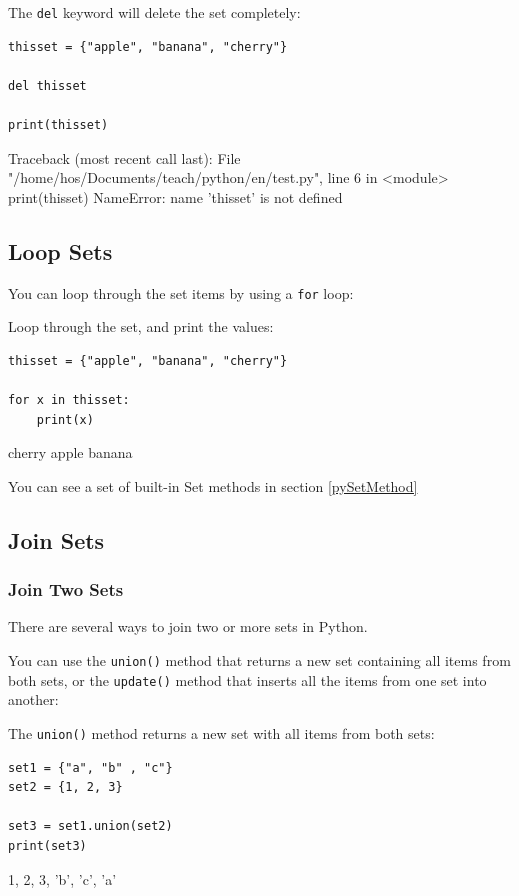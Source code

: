 \documentclass[12pt,a4paper]{article}
\newcommand{\code}[1]{%
	\colorbox{backcolour}{\lstinline{#1}}%
}
\newcommand{\lcode}[1]{%
	\lstinline{#1}%
}
\begin{document}
\begin{abox}
The \lcode{del} keyword will delete the set completely:
	\begin{lstlisting}
thisset = {"apple", "banana", "cherry"}

del thisset

print(thisset)
	\end{lstlisting}
\tcblower
	\begin{vercode}
Traceback (most recent call last):
  File "/home/hos/Documents/teach/python/en/test.py", line 6
  in <module>
    print(thisset)
NameError: name 'thisset' is not defined
	\end{vercode}
\end{abox}
% 
\subsection{Loop Sets}

You can loop through the set items by using a \code{for} loop:

\begin{ebox}
Loop through the set, and print the values:
	\begin{lstlisting}
thisset = {"apple", "banana", "cherry"}

for x in thisset:
    print(x)
	\end{lstlisting}
\tcblower
	\begin{vercode}
cherry
apple
banana
	\end{vercode}
\end{ebox}
You can see a set of built-in Set methods in section \ref{pySetMethod}
\subsection{Join Sets}

\subsubsection{Join Two Sets}

There are several ways to join two or more sets in Python.

You can use the \code{union()} method that returns a new set containing all
items from both sets, or the \code{update()} method that inserts all the items
from one set into another:

\begin{ebox}
The \lcode{union()} method returns a new set with all items from both sets:
	\begin{lstlisting}
set1 = {"a", "b" , "c"}
set2 = {1, 2, 3}

set3 = set1.union(set2)
print(set3)
	\end{lstlisting}
\tcblower
	\begin{vercode}
{1, 2, 3, 'b', 'c', 'a'}
	\end{vercode}
\end{ebox}
\end{document}
